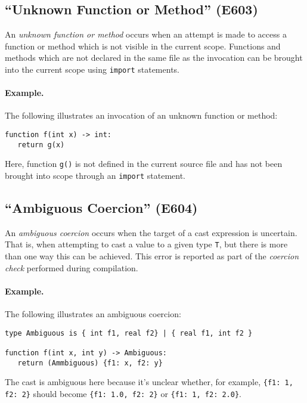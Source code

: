 \subsection{``Unknown Function or Method'' (E603)}

An {\em unknown function or method} occurs when an attempt is made to access a function or method which is not visible in the current scope.  Functions and methods which are not declared in the same file as the invocation can be brought into the current scope using \lstinline{import} statements.  
\paragraph{Example.}  The following illustrates an invocation of an unknown function or method:

\begin{lstlisting}
function f(int x) -> int:
   return g(x)
\end{lstlisting}

Here, function \lstinline{g()} is not defined in the current source file and has not been brought into scope through an \lstinline{import} statement.

\subsection{``Ambiguous Coercion'' (E604)}

An {\em ambiguous coercion} occurs when the target of a cast expression is uncertain.  That is, when attempting to cast a value to a given type \lstinline{T}, but there is more than one way this can be achieved.  This error is reported as part of the {\em coercion check} performed during compilation.

\paragraph{Example.}  The following illustrates an ambiguous coercion:

\begin{lstlisting}
type Ambiguous is { int f1, real f2} | { real f1, int f2 }

function f(int x, int y) -> Ambiguous:
   return (Ammbiguous) {f1: x, f2: y}
\end{lstlisting}

The cast is ambiguous here because it's unclear whether, for example, \lstinline|{f1: 1, f2: 2}| should become \lstinline|{f1: 1.0, f2: 2}| or \lstinline|{f1: 1, f2: 2.0}|.

